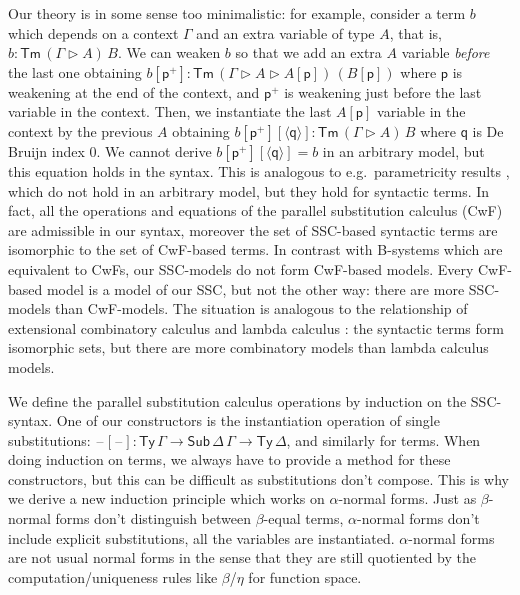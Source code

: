 \documentclass[sigplan,10pt,anonymous,review]{acmart}\settopmatter{printfolios=true,printccs=false,printacmref=false}
\newcommand{\ra}{\rightarrow}
\newcommand{\Ty}{\mathsf{Ty}}
\newcommand{\Tm}{\mathsf{Tm}}
\newcommand{\Sub}{\mathsf{Sub}}
\newcommand{\p}{\mathsf{p}}
\newcommand{\q}{\mathsf{q}}
\newcommand{\ext}{\mathop{\triangleright}}
\newcommand{\blank}{\mathord{\hspace{1pt}\text{--}\hspace{1pt}}} %
\begin{document}
Our theory is in some sense too minimalistic: for example, consider a
term $b$ which depends on a context $\Gamma$ and an extra variable of
type $A$, that is, $b : \Tm\,(\Gamma\ext A)\,B$. We can weaken $b$ so
that we add an extra $A$ variable \emph{before} the last one obtaining
$b[\p^+] : \Tm\,(\Gamma\ext A\ext A[\p])\,(B[\p])$ where $\p$ is
weakening at the end of the context, and $\p^+$ is weakening just
before the last variable in the context. Then, we instantiate the last
$A[\p]$ variable in the context by the previous $A$ obtaining
$b[\p^+][\langle\q\rangle] : \Tm\,(\Gamma\ext A)\,B$ where $\q$ is De
Bruijn index $0$. We cannot derive $b[\p^+][\langle\q\rangle] = b$ in
an arbitrary model, but this equation holds in the syntax.
This is analogous to e.g.\ parametricity results
\cite{DBLP:journals/jfp/BernardyJP12}, which do not hold in an
arbitrary model, but they hold for syntactic terms. In fact, all the
operations and equations of the parallel substitution calculus (CwF)
are admissible in our syntax, moreover the set of SSC-based syntactic
terms are isomorphic to the set of CwF-based terms. In contrast with
B-systems which are equivalent to CwFs, our SSC-models do not form
CwF-based models. Every CwF-based model is a model of our SSC, but not
the other way: there are more SSC-models than CwF-models. The
situation is analogous to the relationship of extensional combinatory
calculus and lambda calculus \cite{DBLP:conf/fscd/AltenkirchKSV23}:
the syntactic terms form isomorphic sets, but there are more
combinatory models than lambda calculus models.

We define the parallel substitution calculus operations by induction
on the SSC-syntax. One of our constructors is the instantiation
operation of single substitutions: $\blank[\blank] :
\Ty\,\Gamma\ra\Sub\,\Delta\,\Gamma\ra\Ty\,\Delta$, and similarly for
terms. When doing induction on terms, we always have to provide a
method for these constructors, but this can be difficult as
substitutions don't compose. This is why we derive a new induction
principle which works on $\alpha$-normal forms. Just as $\beta$-normal
forms don't distinguish between $\beta$-equal terms, $\alpha$-normal
forms don't include explicit substitutions, all the variables are
instantiated. $\alpha$-normal forms are not usual normal forms in the
sense that they are still quotiented by the computation/uniqueness
rules like $\beta$/$\eta$ for function space.
\end{document}
